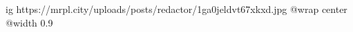  
 
 
 
 

\ifcmt
  ig https://mrpl.city/uploads/posts/redactor/1ga0jeldvt67xkxd.jpg
  @wrap center
  @width 0.9
\fi
